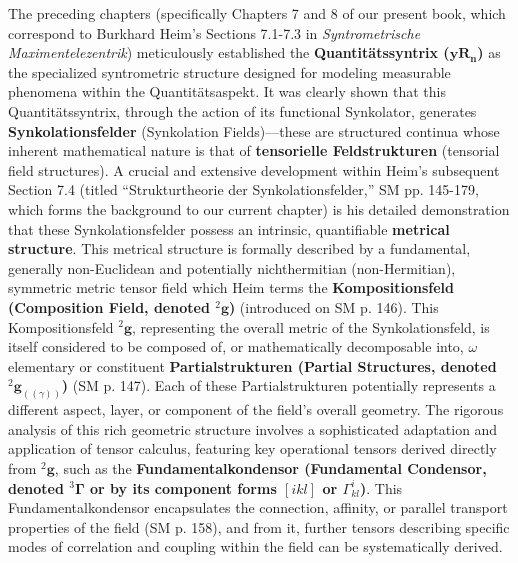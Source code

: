 \documentclass[12pt]{article}
\newcommand{\q}[1]{\enquote{#1}}
\newcommand{\quantitaetssyntrix}{\bm{yR_n}}
\newcommand{\kompositionsfeld}{{}^2\mathbf{g}}
\newcommand{\partialstruktur}[1]{{}^2\mathbf{g}_{(#1)}} %
\newcommand{\fundamentalkondensor}{{}^3\bm{\Gamma}}
\begin{document}
The preceding chapters (specifically Chapters 7 and 8 of our present book, which correspond to Burkhard Heim's Sections 7.1-7.3 in \textit{Syntrometrische Maximentelezentrik}) meticulously established the \textbf{Quantitätssyntrix (\(\quantitaetssyntrix\))} as the specialized syntrometric structure designed for modeling measurable phenomena within the Quantitätsaspekt. It was clearly shown that this Quantitätssyntrix, through the action of its functional Synkolator, generates \textbf{Synkolationsfelder} (Synkolation Fields)—these are structured continua whose inherent mathematical nature is that of \textbf{tensorielle Feldstrukturen} (tensorial field structures). A crucial and extensive development within Heim's subsequent Section 7.4 (titled \q{Strukturtheorie der Synkolationsfelder,} SM pp. 145-179, which forms the background to our current chapter) is his detailed demonstration that these Synkolationsfelder possess an intrinsic, quantifiable \textbf{metrical structure}. This metrical structure is formally described by a fundamental, generally non-Euclidean and potentially nichthermitian (non-Hermitian), symmetric metric tensor field which Heim terms the \textbf{Kompositionsfeld (Composition Field, denoted \( \kompositionsfeld \))} (introduced on SM p. 146). This Kompositionsfeld \( \kompositionsfeld \), representing the overall metric of the Synkolationsfeld, is itself considered to be composed of, or mathematically decomposable into, \( \omega \) elementary or constituent \textbf{Partialstrukturen (Partial Structures, denoted \( \partialstruktur{(\gamma)} \))} (SM p. 147). Each of these Partialstrukturen potentially represents a different aspect, layer, or component of the field's overall geometry. The rigorous analysis of this rich geometric structure involves a sophisticated adaptation and application of tensor calculus, featuring key operational tensors derived directly from \( \kompositionsfeld \), such as the \textbf{Fundamentalkondensor (Fundamental Condensor, denoted \( \fundamentalkondensor \) or by its component forms \( [ikl] \) or \( \Gamma^i_{kl} \))}. This Fundamentalkondensor encapsulates the connection, affinity, or parallel transport properties of the field (SM p. 158), and from it, further tensors describing specific modes of correlation and coupling within the field can be systematically derived.
\end{document}
